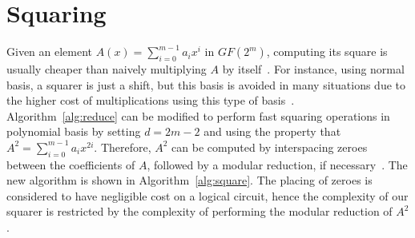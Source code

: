 




\section{Squaring} \label{squaring}

Given an element $A(x) = \sum_{i=0}^{m-1} a_i x^i$ in $GF(2^m)$, computing its square is usually cheaper than naively multiplying $A$ by itself~\cite{fan2015survey}. For instance, using normal basis, a squarer is just a shift, but this basis is avoided in many situations due to the higher cost of multiplications using this type of  basis~\cite{fan2015survey}.\\

Algorithm~\ref{alg:reduce} can be modified to perform fast squaring operations in polynomial basis by setting $d=2m-2$ and using the property that $A^2 = \sum_{i=0}^{m-1} a_i x^{2i}$. Therefore, $A^2$ can be computed by interspacing zeroes between the coefficients of $A$, followed by a modular reduction, if necessary~\cite{wu2002bit}. The new algorithm is shown in Algorithm~\ref{alg:square}. The placing of zeroes is considered to have negligible cost on a logical circuit, hence the complexity of our squarer is restricted by the complexity of performing the modular reduction of $A^2$.\\

